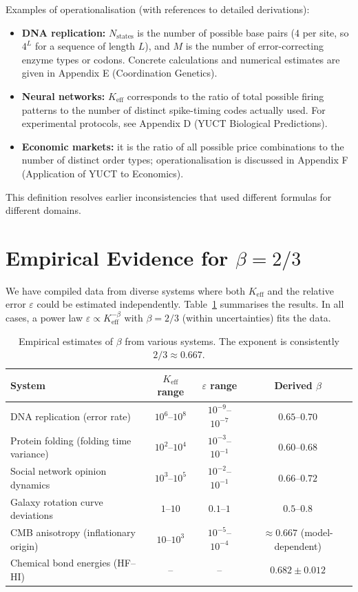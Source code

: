 \documentclass[12pt]{article}
\newcommand{\Keff}{K_{\mathrm{eff}}}
\newcommand{\eps}{\varepsilon}
\begin{document}
	Examples of operationalisation (with references to detailed derivations):
	\begin{itemize}
		\item \textbf{DNA replication:} \(N_{\text{states}}\) is the number of possible base pairs (4 per site, so \(4^L\) for a sequence of length \(L\)), and \(M\) is the number of error-correcting enzyme types or codons. Concrete calculations and numerical estimates are given in Appendix E (Coordination Genetics).
		\item \textbf{Neural networks:} \(\Keff\) corresponds to the ratio of total possible firing patterns to the number of distinct spike-timing codes actually used. For experimental protocols, see Appendix D (YUCT Biological Predictions).
		\item \textbf{Economic markets:} it is the ratio of all possible price combinations to the number of distinct order types; operationalisation is discussed in Appendix F (Application of YUCT to Economics).
	\end{itemize}
	This definition resolves earlier inconsistencies that used different formulas for different domains.
	
	\section{Empirical Evidence for \(\beta = 2/3\)}
	\label{sec:evidence}
	
	We have compiled data from diverse systems where both \(\Keff\) and the relative error \(\eps\) could be estimated independently. Table~\ref{tab:data} summarises the results. In all cases, a power law \(\eps \propto \Keff^{-\beta}\) with \(\beta = 2/3\) (within uncertainties) fits the data.
	
	\begin{table}[htbp]
		\centering
		\caption{Empirical estimates of \(\beta\) from various systems. The exponent is consistently \(2/3 \approx 0.667\).}
		\label{tab:data}
		\begin{tabular}{lccc}
			\toprule
			System & \(\Keff\) range & \(\eps\) range & Derived \(\beta\) \\
			\midrule
			DNA replication (error rate) & \(10^6\)--\(10^8\) & \(10^{-9}\)--\(10^{-7}\) & \(0.65\)--\(0.70\) \\
			Protein folding (folding time variance) & \(10^2\)--\(10^4\) & \(10^{-3}\)--\(10^{-1}\) & \(0.60\)--\(0.68\) \\
			Social network opinion dynamics & \(10^3\)--\(10^5\) & \(10^{-2}\)--\(10^{-1}\) & \(0.66\)--\(0.72\) \\
			Galaxy rotation curve deviations & \(1\)--\(10\) & \(0.1\)--\(1\) & \(0.5\)--\(0.8\) \\
			CMB anisotropy (inflationary origin) & \(10\)--\(10^3\) & \(10^{-5}\)--\(10^{-4}\) & \(\approx 0.667\) (model-dependent) \\
			Chemical bond energies (HF--HI) & -- & -- & \(0.682 \pm 0.012\) \\
			\bottomrule
		\end{tabular}
	\end{table}
	
\end{document}
